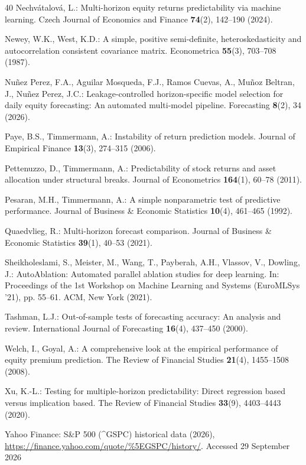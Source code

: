 \documentclass[runningheads,orivec]{llncs}
\begin{document}
\begin{thebibliography}{40}
Nechv{\'a}talov{\'a}, L.: Multi-horizon equity returns predictability via machine learning. Czech Journal of Economics and Finance \textbf{74}(2), 142--190 (2024).

Newey, W.K., West, K.D.: A simple, positive semi-definite, heteroskedasticity and autocorrelation consistent covariance matrix. Econometrica \textbf{55}(3), 703--708 (1987).

Nu{\~n}ez Perez, F.A., Aguilar Mosqueda, F.J., Ramos Cuevas, A., Mu{\~n}oz Beltran, J., Nu{\~n}ez Perez, J.C.: Leakage-controlled horizon-specific model selection for daily equity forecasting: An automated multi-model pipeline. Forecasting \textbf{8}(2), 34 (2026).

Paye, B.S., Timmermann, A.: Instability of return prediction models. Journal of Empirical Finance \textbf{13}(3), 274--315 (2006).

Pettenuzzo, D., Timmermann, A.: Predictability of stock returns and asset allocation under structural breaks. Journal of Econometrics \textbf{164}(1), 60--78 (2011).

Pesaran, M.H., Timmermann, A.: A simple nonparametric test of predictive performance. Journal of Business \& Economic Statistics \textbf{10}(4), 461--465 (1992).

Quaedvlieg, R.: Multi-horizon forecast comparison. Journal of Business \& Economic Statistics \textbf{39}(1), 40--53 (2021).

Sheikholeslami, S., Meister, M., Wang, T., Payberah, A.H., Vlassov, V., Dowling, J.: AutoAblation: Automated parallel ablation studies for deep learning. In: Proceedings of the 1st Workshop on Machine Learning and Systems (EuroMLSys '21), pp. 55--61. ACM, New York (2021).

Tashman, L.J.: Out-of-sample tests of forecasting accuracy: An analysis and review. International Journal of Forecasting \textbf{16}(4), 437--450 (2000).

Welch, I., Goyal, A.: A comprehensive look at the empirical performance of equity premium prediction. The Review of Financial Studies \textbf{21}(4), 1455--1508 (2008).

Xu, K.-L.: Testing for multiple-horizon predictability: Direct regression based versus implication based. The Review of Financial Studies \textbf{33}(9), 4403--4443 (2020).

Yahoo Finance: S\&P 500 (\textasciicircum GSPC) historical data (2026), \url{https://finance.yahoo.com/quote/%5EGSPC/history/}. Accessed 29 September 2026
\end{thebibliography}
\end{document}
